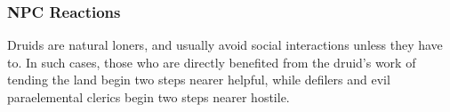 \subsubsection{NPC Reactions}
Druids are natural loners, and usually avoid social interactions unless they have to. In such cases, those who are directly benefited from the druid's work of tending the land begin two steps nearer helpful, while defilers and evil paraelemental clerics begin two steps nearer hostile.





